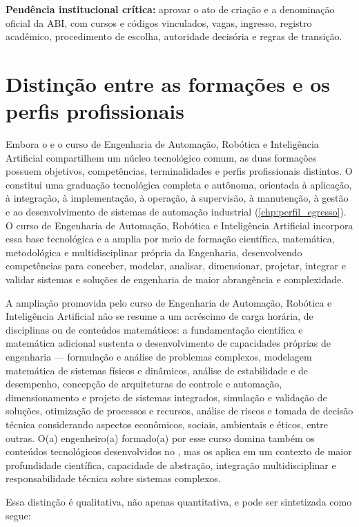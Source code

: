 \textbf{Pendência institucional crítica:} aprovar o ato de criação e a denominação oficial da ABI, com cursos e códigos vinculados, vagas, ingresso, registro acadêmico, procedimento de escolha, autoridade decisória e regras de transição.

\section{Distinção entre as formações e os perfis profissionais}
\label{sec:distincao_perfis}

Embora o \ppccurso e o curso de Engenharia de Automação, Robótica e Inteligência Artificial compartilhem um núcleo tecnológico comum, as duas formações possuem objetivos, competências, terminalidades e perfis profissionais distintos. O \ppccurso constitui uma graduação tecnológica completa e autônoma, orientada à aplicação, à integração, à implementação, à operação, à supervisão, à manutenção, à gestão e ao desenvolvimento de sistemas de automação industrial (\autoref{chp:perfil_egresso}). O curso de Engenharia de Automação, Robótica e Inteligência Artificial incorpora essa base tecnológica e a amplia por meio de formação científica, matemática, metodológica e multidisciplinar própria da Engenharia, desenvolvendo competências para conceber, modelar, analisar, dimensionar, projetar, integrar e validar sistemas e soluções de engenharia de maior abrangência e complexidade.

A ampliação promovida pelo curso de Engenharia de Automação, Robótica e Inteligência Artificial não se resume a um acréscimo de carga horária, de disciplinas ou de conteúdos matemáticos: a fundamentação científica e matemática adicional sustenta o desenvolvimento de capacidades próprias de engenharia — formulação e análise de problemas complexos, modelagem matemática de sistemas físicos e dinâmicos, análise de estabilidade e de desempenho, concepção de arquiteturas de controle e automação, dimensionamento e projeto de sistemas integrados, simulação e validação de soluções, otimização de processos e recursos, análise de riscos e tomada de decisão técnica considerando aspectos econômicos, sociais, ambientais e éticos, entre outras. O(a) engenheiro(a) formado(a) por esse curso domina também os conteúdos tecnológicos desenvolvidos no \ppccurso, mas os aplica em um contexto de maior profundidade científica, capacidade de abstração, integração multidisciplinar e responsabilidade técnica sobre sistemas complexos.

Essa distinção é qualitativa, não apenas quantitativa, e pode ser sintetizada como segue:

